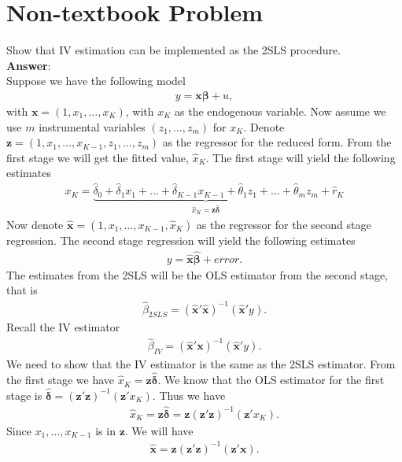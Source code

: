 \documentclass[10pt]{article}
\begin{document}
\section*{Non-textbook Problem}
Show that IV estimation can be implemented as the 2SLS procedure.
\\ \textbf{Answer}:\\
Suppose we have the following model
\begin{align*}
    y=\textbf{x}\pmb{\beta}+u,
\end{align*}
with $\textbf{x}=(1,x_1,\ldots,x_K)$, with $x_K$ as the endogenous variable. Now assume we use $m$ instrumental variables $(z_1,\ldots,z_m)$ for $x_K$. Denote $\textbf{z}=(1,x_1,\ldots,x_{K-1},z_1,\ldots,z_m)$ as the regressor for the reduced form. From the first stage we will get the fitted value, $\hat{x}_K$. The first stage will yield the following estimates
\begin{align*}
    x_K=\underbrace{\hat{\delta}_0+\hat{\delta}_1 x_1+\ldots+\hat{\delta}_{K-1}x_{K-1}+\hat{\theta}_1 z_1+\ldots+\hat{\theta}_m z_m}_{\displaystyle \hat{x}_K=\textbf{z}\hat{\pmb{\delta}}}+\hat{r}_K
\end{align*}
Now denote $\hat{\textbf{x}}=(1,x_1,\ldots,x_{K-1},\hat{x}_K)$ as the regressor for the second stage regression. The second stage regression will yield the following estimates
\begin{align*}
    y=\hat{\textbf{x}}\hat{\pmb{\beta}}+error.
\end{align*}
The estimates from the 2SLS will be the OLS estimator from the second stage, that is
\begin{align*}
    \hat{\beta}_{2SLS}=(\hat{\textbf{x}}'\hat{\textbf{x}})^{-1}(\hat{\textbf{x}}'y).
\end{align*}
Recall the IV estimator
\begin{align*}
    \hat{\beta}_{IV}=(\hat{\textbf{x}}'\textbf{x})^{-1}(\hat{\textbf{x}}'y).
\end{align*}
We need to show that the IV estimator is the same as the 2SLS estimator. From the first stage we have $\hat{x}_K=\textbf{z}\hat{\pmb{\delta}}$. We know that the OLS estimator for the first stage is $\hat{\pmb{\delta}}=(\textbf{z}'\textbf{z})^{-1}(\textbf{z}'x_K).$ Thus we have
\begin{align*}
    \hat{x}_K=\textbf{z}\hat{\pmb{\delta}}=\textbf{z}(\textbf{z}'\textbf{z})^{-1}(\textbf{z}'x_K).
\end{align*}
Since $x_1,\ldots,x_{K-1}$ is in $\textbf{z}.$ We will have
\begin{align*}
    \hat{\textbf{x}}=\textbf{z}(\textbf{z}'\textbf{z})^{-1}(\textbf{z}'\textbf{x}).
\end{align*}
\end{document}
